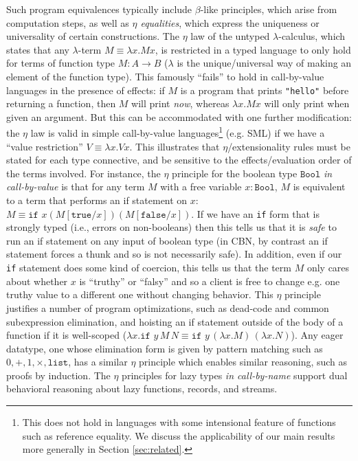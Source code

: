 \documentclass[acmsmall,nonacm]{acmart}
\newcommand{\kw}[1]{\texttt{#1}\,\,}
\begin{document}
Such program equivalences typically include $\beta$-like principles,
which arise from computation steps, as well as \emph{$\eta$ equalities},
which express the uniqueness or universality of certain constructions.
%
The $\eta$ law of the untyped $\lambda$-calculus, which
states that any $\lambda$-term $M \equiv \lambda x. M x$, is
restricted in a typed language to only hold for terms of function type $M
: A \to B$ ($\lambda$ is the unique/universal way of making an element
of the function type).  
%
This famously ``fails'' to hold in call-by-value languages in the
presence of effects: if $M$ is a program that prints \texttt{"hello"}
before returning a function, then $M$ will print \emph{now}, whereas
$\lambda x. M x$ will only print when given an argument. But this can be
accommodated with one further modification: the $\eta$ law is valid in
simple call-by-value languages\footnote{This does not hold in languages
  with some intensional feature of functions such as reference
  equality. We discuss the applicability of our main results more generally in Section \ref{sec:related}.} (e.g. SML) if we have a ``value
restriction'' $V \equiv \lambda x. V x$.
%
This illustrates that $\eta$/extensionality rules must be stated for
each type connective, and be sensitive to the effects/evaluation order
of the terms involved.
%
For instance, the $\eta$ principle for the boolean type $\texttt{Bool}$
\emph{in call-by-value} is that for any term $M$ with a free variable $x :
\texttt{Bool}$, $M$ is equivalent to a term that performs an if
statement on $x$: $M \equiv \kw{if} x (M[\texttt{true}/x])
(M[\texttt{false}/x])$.
%
If we have an \texttt{if} form that is strongly typed (i.e., errors on
non-booleans) then this tells us that it is \emph{safe} to run an if
statement on any input of boolean type (in CBN, by contrast an if
statement forces a thunk and so is not necessarily safe).
%
In addition, even if our \texttt{if} statement does some kind of
coercion, this tells us that the term $M$ only cares about whether $x$
is ``truthy'' or ``falsy'' and so a client is free to change e.g. one
truthy value to a different one without changing behavior.
%
This $\eta$ principle justifies a number of program optimizations,
such as dead-code and common subexpression elimination, and 
hoisting an if
statement outside of the body of a function if it is well-scoped
($\lambda x. \kw{if} y \, M \, N \equiv \kw {if} y \, (\lambda x.M) \, (\lambda x.N)$).
%
Any eager datatype, one whose elimination form is given by pattern
matching such as $0, +, 1, \times, \mathtt{list}$, has a similar $\eta$
principle which enables similar reasoning, such as proofs by induction.
%
The $\eta$ principles for lazy types \emph{in call-by-name} support dual
behavioral reasoning about lazy functions, records, and streams.
\end{document}
